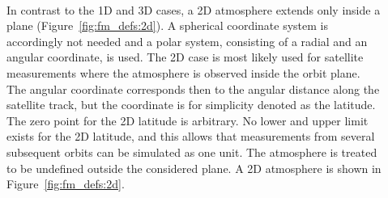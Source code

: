 \begin{description}
\item[\,\,\,] In contrast to the 1D and 3D cases, a 2D
  atmosphere extends only inside a plane
  (Figure~\ref{fig:fm_defs:2d}). A spherical coordinate system is
  accordingly not needed and a polar system, consisting of a radial and an angular coordinate, is
  used. The 2D case is most likely used for satellite measurements
  where the atmosphere is observed inside the orbit plane. The angular
  coordinate corresponds then to the angular distance along the
  satellite track, but the coordinate is for simplicity denoted as the
  latitude. The zero point for the 2D latitude is arbitrary. No lower
  and upper limit exists for the 2D latitude, and this allows that
  measurements from several subsequent orbits can be simulated as one
  unit. The atmosphere is treated to be undefined outside the
  considered plane. A 2D atmosphere is shown in
  Figure~\ref{fig:fm_defs:2d}.

\end{description}

